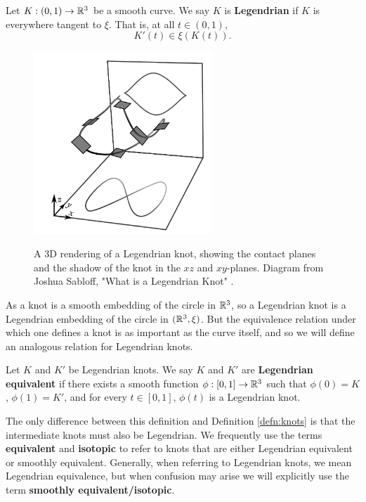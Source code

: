 \begin{definition}
    Let $K: (0, 1) \to \mathbb{R}^3$ be a smooth curve. We say $K$ is \textbf{Legendrian} if $K$ is everywhere tangent to $\xi$. That is, at all $t \in (0, 1)$,
    \[
        K'(t) \in \xi(K(t)).
    \]
\end{definition}

\begin{figure}
    \centering
    \includegraphics[width=0.6\textwidth]{images/Sabloff-3D.pdf}
    \label{fig:sabloff-3d}
    \caption{A 3D rendering of a Legendrian knot, showing the contact planes and the shadow of the knot in the $xz$ and $xy$-planes. Diagram from Joshua Sabloff, "What is a Legendrian Knot" \cite{sabloff-whatis}.}
\end{figure}

As a knot is a smooth embedding of the circle in $\mathbb{R}^3$, so a Legendrian knot is a Legendrian embedding of the circle in $(\mathbb{R}^3, \xi)$. But the equivalence relation under which one defines a knot is as important as the curve itself, and so we will define an analogous relation for Legendrian knots. 

\begin{definition}
    Let $K$ and $K'$ be Legendrian knots. We say $K$ and $K'$ are \textbf{Legendrian equivalent} if there exists a smooth function ${\phi: [0, 1] \to \mathbb{R}^3}$ such that
    ${\phi(0) = K}$, ${\phi(1) = K'}$, and for every ${t \in [0, 1]}$, $\phi(t)$ is a Legendrian knot.
\end{definition}

The only difference between this definition and Definition \ref{defn:knots} is that the intermediate knots must also be Legendrian.
We frequently use the terms \textbf{equivalent} and \textbf{isotopic} to refer to knots that are either Legendrian equivalent or smoothly equivalent. Generally, when referring to Legendrian knots, we mean Legendrian equivalence, but when confusion may arise we will explicitly use the term \textbf{smoothly equivalent/isotopic}.


